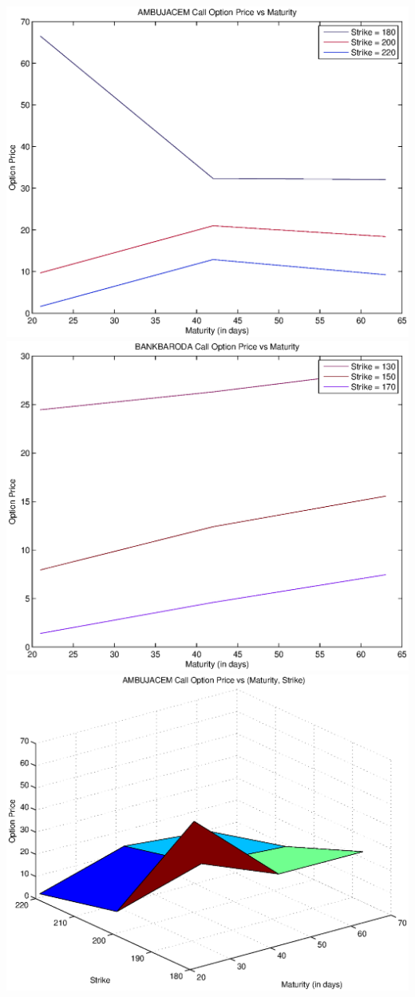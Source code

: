 \documentclass{article}
\begin{document}
\includegraphics[width=\textwidth]{AMBUJACEM_Call_Option_Price_vs_Maturity} \\             
\includegraphics[width=\textwidth]{BANKBARODA_Call_Option_Price_vs_Maturity} \\
\includegraphics[width=\textwidth]{AMBUJACEM_Call_Option_Price_vs_(Maturity,_Strike)} \\   
\end{document}
